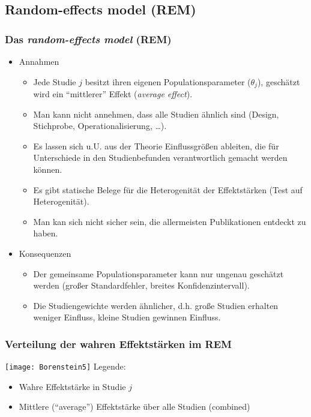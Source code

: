 \subsection{Random-effects model (REM)}

\begin{frame}[shrink=10]
  \frametitle{Das \emph{random-effects model} (REM)}
  \begin{itemize}
  \item Annahmen
    \begin{itemize}
    \item Jede Studie $j$ besitzt ihren eigenen Populationsparameter
      ($\theta_j$), geschätzt wird ein "`mittlerer"' Effekt (\emph{average effect}).
    \item Man kann nicht annehmen, dass alle Studien ähnlich sind (Design,
      Stichprobe, Operationalisierung, \ldots).
    \item Es lassen sich u.U. aus der Theorie Einflussgrößen ableiten, die für
      Unterschiede in den Studienbefunden verantwortlich gemacht werden können.
    \item Es gibt statische Belege für die Heterogenität der Effektstärken (Test
      auf Heterogenität).
    \item Man kan sich nicht sicher sein, die allermeisten Publikationen
      entdeckt zu haben.
    \end{itemize}
  \item Konsequenzen
    \begin{itemize}
    \item Der gemeinsame Populationsparameter kann nur ungenau geschätzt werden
      (großer Standardfehler, breites Konfidenzintervall).
    \item Die Studiengewichte werden ähnlicher, d.h. große Studien erhalten
      weniger Einfluss, kleine Studien gewinnen Einfluss.
    \end{itemize}
  \end{itemize}
\end{frame}


\begin{frame}
  \frametitle{Verteilung der wahren Effektstärken im REM}
  \texttt{[image: Borenstein5]}
  \newline
  Legende:
  \begin{itemize}
  \item[\FilledSmallCircle] Wahre Effektstärke in Studie $j$
  \item[\FilledSmallTriangleDown] Mittlere ("`average"') Effektstärke über alle
    Studien (combined)
  \end{itemize}
  \citep[Quelle: ][70]{borenstein_introduction_2009}
\end{frame}


